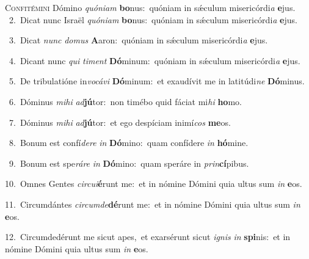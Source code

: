 \lettrine{\initial\textcolor{\initialcolor}{C}}{onfitémini} Dómino \textit{quón}\-\textit{i}\textit{am} \textbf{bo}\-nus:~\star quóniam in sǽculum misericórdi\textit{a} \textbf{e}\-jus.\\
{\numbfont\textcolor{\numbcolor}{~2.}}~Dicat nunc Israël \textit{quón}\-\textit{i}\textit{am} \textbf{bo}\-nus:~\star quóniam in sǽculum misericórdi\textit{a} \textbf{e}\-jus.\par
{\numbfont\textcolor{\numbcolor}{~3.}}~Dicat \textit{nunc} \textit{do}\-\textit{mus} \textbf{A}\-aron:~\star quóniam in sǽculum misericórdi\textit{a} \textbf{e}\-jus.\par
{\numbfont\textcolor{\numbcolor}{~4.}}~Dicant nunc \textit{qui} \textit{ti}\-\textit{ment} \textbf{Dó}\-minum:~\star quóniam in sǽculum misericórdi\textit{a} \textbf{e}\-jus.\par
{\numbfont\textcolor{\numbcolor}{~5.}}~De tribulatióne in\-\textit{vo}\-\textit{cá}\textit{vi} \textbf{Dó}\-minum:~\star et exaudívit me in latitúdi\textit{ne} \textbf{Dó}\-minus.\par
{\numbfont\textcolor{\numbcolor}{~6.}}~Dóminus \textit{mi}\-\textit{hi} \textit{ad}\-\textbf{jú}tor:~\star non timébo quid fáciat mi\textit{hi} \textbf{ho}\-mo.\par
{\numbfont\textcolor{\numbcolor}{~7.}}~Dóminus \textit{mi}\-\textit{hi} \textit{ad}\-\textbf{jú}tor:~\star et ego despíciam inimí\textit{cos} \textbf{me}\-os.\par
{\numbfont\textcolor{\numbcolor}{~8.}}~Bonum est confí\-\textit{de}\-\textit{re} \textit{in} \textbf{Dó}\-mino:~\star quam confídere \textit{in} \textbf{hó}\-mine.\par
{\numbfont\textcolor{\numbcolor}{~9.}}~Bonum est spe\-\textit{rá}\-\textit{re} \textit{in} \textbf{Dó}\-mino:~\star quam speráre in \textit{prin}\-\textbf{cí}pibus.\par
{\numbfont\textcolor{\numbcolor}{10.}}~Omnes Gentes \textit{cir}\-\textit{cu}\textit{i}\textbf{é}runt me:~\star et in nómine Dómini quia ultus sum \textit{in} \textbf{e}\-os.\par
{\numbfont\textcolor{\numbcolor}{11.}}~Circumdántes \textit{cir}\-\textit{cum}\textit{de}\textbf{dé}runt me:~\star et in nómine Dómini quia ultus sum \textit{in} \textbf{e}\-os.\par
{\numbfont\textcolor{\numbcolor}{12.}}~Circumdedérunt me sicut apes,~\dagger et exarsérunt sicut \textit{i}\-\textit{gnis} \textit{in} \textbf{spi}\-nis:~\star et in nómine Dómini quia ultus sum \textit{in} \textbf{e}\-os.\par
